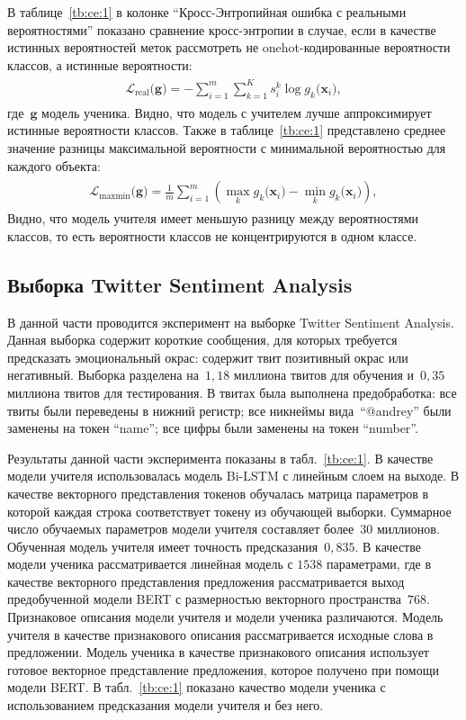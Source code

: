 \documentclass[12pt]{a&t}
\begin{document}
В таблице~\ref{tb:ce:1} в колонке ``Кросс-Энтропийная ошибка с реальными вероятностями'' показано сравнение кросс-энтропии в случае, если в качестве истинных вероятностей меток рассмотреть не onehot-кодированные вероятности классов, а истинные вероятности:
\begin{gather}
\label{eq:ce:1}
\begin{aligned}
\mathcal{L}_{\text{real}}\bigr(\mathbf{g}\bigr) = - \sum_{i=1}^{m}\sum_{k=1}^{K}s_{i}^{k}\log g_k\bigr(\mathbf{x}_i\bigr),
\end{aligned}
\end{gather}
где~$\mathbf{g}$ модель ученика. Видно, что модель с учителем лучше аппроксимирует истинные вероятности классов. Также в таблице~\ref{tb:ce:1} представлено среднее значение разницы максимальной вероятности с минимальной вероятностью для каждого объекта:
\begin{gather}
\label{eq:ce:2}
\begin{aligned}
\mathcal{L}_{\text{maxmin}}\bigr(\mathbf{g}\bigr) = \frac{1}{m}\sum_{i=1}^{m}\left(\max_{k}g_k\bigr(\mathbf{x}_i\bigr) -  \min_{k}g_k\bigr(\mathbf{x}_i\bigr)\right),
\end{aligned}
\end{gather}
Видно, что модель учителя имеет меньшую разницу между вероятностями классов, то есть вероятности классов не концентрируются в одном классе.

\subsection{Выборка Twitter Sentiment Analysis}
В данной части проводится эксперимент на выборке Twitter Sentiment Analysis. Данная выборка содержит короткие сообщения, для которых требуется предсказать эмоциональный окрас: содержит твит позитивный окрас или негативный. Выборка разделена на~$1{,}18$ миллиона твитов для обучения и~$0{,}35$ миллиона твитов для тестирования. В твитах была выполнена предобработка: все твиты были переведены в нижний регистр; все никнеймы вида~``@andrey'' были заменены на токен ``name''; все цифры были заменены на токен ``number''.

Результаты данной части эксперимента показаны в табл.~\ref{tb:ce:1}. В качестве модели учителя использовалась модель Bi-LSTM с линейным слоем на выходе. В качестве векторного представления токенов обучалась матрица параметров в которой каждая строка соответствует токену из обучающей выборки. Суммарное число обучаемых параметров модели учителя составляет более~$30$ миллионов. Обученная модель учителя имеет точность предсказания~$0{,}835$. В качестве модели ученика рассматривается линейная модель с $1538$ параметрами, где в качестве векторного представления предложения рассматривается выход предобученной модели BERT с размерностью векторного пространства~$768$. Признаковое описания модели учителя и модели ученика различаются. Модель учителя в качестве признакового описания рассматривается исходные слова в предложении. Модель ученика в качестве признакового описания использует готовое векторное представление предложения, которое получено при помощи модели BERT. В табл.~\ref{tb:ce:1} показано качество модели ученика с использованием предсказания модели учителя и без него.
\end{document}
